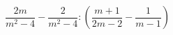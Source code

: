 \begin{ex}[type=expression]
	\begin{condition}
		\( \dfrac{2m}{m^2-4}-\dfrac{2}{m^2-4}:\left( \dfrac{m+1}{2m-2}-\dfrac{1}{m-1} \right) \)
	\end{condition}
\end{ex}